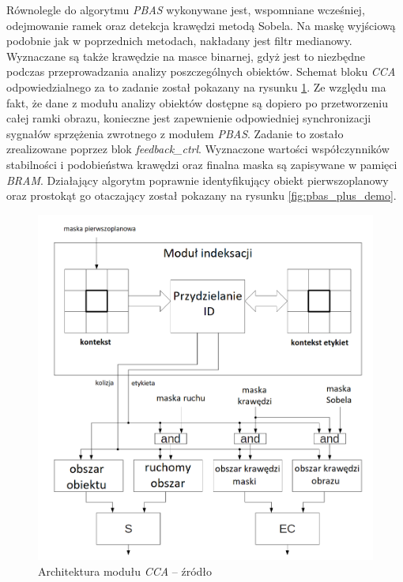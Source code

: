 Równolegle do algorytmu \textit{PBAS} wykonywane jest, wspomniane wcześniej, odejmowanie ramek oraz detekcja krawędzi metodą Sobela. 
Na maskę wyjściową podobnie jak w poprzednich metodach, nakładany jest filtr medianowy. 
Wyznaczane są także krawędzie na masce binarnej, gdyż jest to niezbędne podczas przeprowadzania analizy poszczególnych obiektów. 
Schemat bloku \textit{CCA} odpowiedzialnego za to zadanie został pokazany na rysunku \ref{fig:cca_diagram}. 
Ze względu ma fakt, że dane z modułu analizy obiektów dostępne są dopiero po przetworzeniu całej ramki obrazu, konieczne jest zapewnienie odpowiedniej synchronizacji sygnałów sprzężenia zwrotnego z modułem  \textit{PBAS}. 
Zadanie to zostało zrealizowane poprzez blok \textit{feedback\_ctrl}. 
Wyznaczone wartości współczynników stabilności i podobieństwa krawędzi oraz finalna maska są zapisywane w pamięci \textit{BRAM}. 
Działający algorytm poprawnie identyfikujący obiekt pierwszoplanowy oraz prostokąt go otaczający został pokazany na rysunku \ref{fig:pbas_plus_demo}.

	\begin{figure}[h!]
		\centering
		\includegraphics[scale=0.4]{img/4/cca_diagram_2.png}
		\caption{Architektura modułu \textit{CCA} -- źródło \cite{kryjak_14_pbas}}
		\label{fig:cca_diagram}
	\end{figure}

